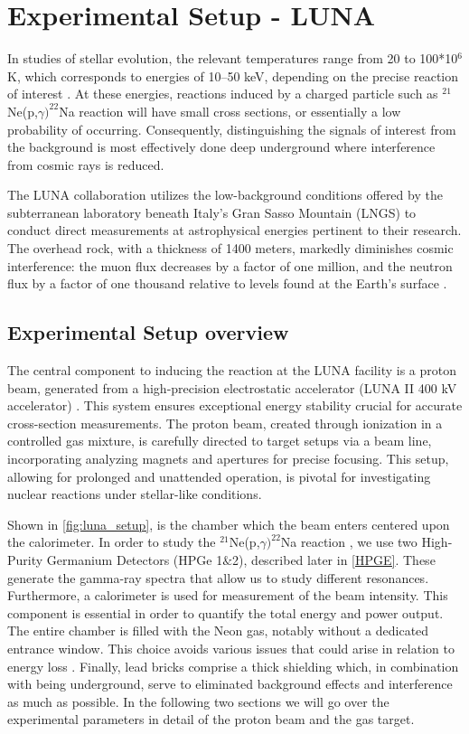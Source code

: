 \documentclass[a4paper,12pt]{article}
\def\reac{$^{21}$Ne(p,$\gamma)^{22}$Na reaction }
\begin{document}
 
\section{Experimental Setup - LUNA}\label{luna}

In studies of stellar evolution, the relevant temperatures range from 20 to 100*10$^6$K, which corresponds to energies of 10–50 keV, depending on the precise reaction of interest \cite{Broggini2010}. At these energies, reactions induced by a charged particle such as \reac will have small cross sections, or essentially a low probability of occurring. Consequently, distinguishing the signals of interest from the background is most effectively done deep underground where interference from cosmic rays is reduced. 

The LUNA collaboration utilizes the low-background conditions offered by the subterranean laboratory beneath Italy's Gran Sasso Mountain (LNGS) to conduct direct measurements at astrophysical energies pertinent to their research. The overhead rock, with a thickness of 1400 meters, markedly diminishes cosmic interference: the muon flux decreases by a factor of one million, and the neutron flux by a factor of one thousand relative to levels found at the Earth’s surface \cite{Bemmerer2005}.

\subsection{Experimental Setup overview}

The central component to inducing the reaction at the LUNA facility is a proton beam, generated from a high-precision electrostatic accelerator (LUNA II 400 kV accelerator) \cite{FORMICOLA2003609}. This system ensures exceptional energy stability crucial for accurate cross-section measurements. The proton beam, created through ionization in a controlled gas mixture, is carefully directed to target setups via a  beam line, incorporating analyzing magnets and apertures for precise focusing. This setup, allowing for prolonged and unattended operation, is pivotal for investigating nuclear reactions under stellar-like conditions.

Shown in \ref{fig:luna_setup}, is the chamber which the beam enters centered upon the calorimeter. In order to study the \reac, we use two High-Purity Germanium Detectors (HPGe 1$\&$2), described later in \ref{HPGE}.  These generate the gamma-ray spectra that allow us to study different resonances.  Furthermore, a calorimeter is used for measurement of the beam intensity.  This component is essential in order to quantify the total energy and power output.  The entire chamber is filled with the Neon gas, notably without a dedicated entrance window.  This choice avoids various issues that could arise in relation to energy loss \cite{chiara}. Finally, lead bricks comprise a thick shielding which, in combination with being underground, serve to eliminated background effects and interference as much as possible.  In the following two sections we will go over the experimental parameters in detail of the proton beam and the gas target.  
\end{document}
